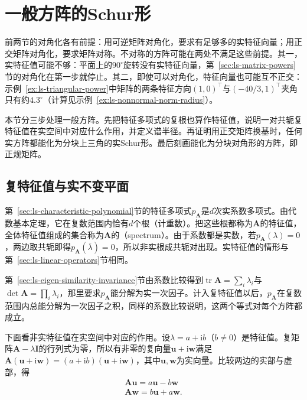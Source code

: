 
\section{一般方阵的Schur形}
\label{sec:ls-general-square-spectrum}

前两节的对角化各有前提：用可逆矩阵对角化，要求有足够多的实特征向量；用正交矩阵对角化，要求矩阵对称。不对称的方阵可能在两处不满足这些前提。其一，实特征值可能不够：平面上的$90^\circ$旋转没有实特征向量，第~\ref{sec:ls-matrix-powers}节的对角化在第一步就停止。其二，即使可以对角化，特征向量也可能互不正交：示例~\ref{ex:ls-triangular-power}中矩阵的两条特征方向$(1,0)^\top$与$(-40/3,1)^\top$夹角只有约$4.3^\circ$（计算见示例~\ref{ex:ls-nonnormal-norm-radius}）。

本节分三步处理一般方阵。先把特征多项式的复根也算作特征值，说明一对共轭复特征值在实空间中对应什么作用，并定义谱半径。再证明用正交矩阵换基时，任何实方阵都能化为分块上三角的实Schur形。最后刻画能化为分块对角形的方阵，即正规矩阵。

\subsection{复特征值与实不变平面}

第~\ref{sec:ls-characteristic-polynomial}节的特征多项式$p_{\bm A}$是$d$次实系数多项式。由代数基本定理，它在复数范围内恰有$d$个根（计重数）。把这些根都称为$\bm A$的特征值，全体特征值组成的集合称为$\bm A$的（spectrum）。由于系数都是实数，若$p_{\bm A}(\lambda)=0$，两边取共轭即得$p_{\bm A}(\bar\lambda)=0$，所以非实根成共轭对出现。实特征值的情形与第~\ref{sec:ls-linear-operators}节相同。

第~\ref{sec:ls-eigen-similarity-invariance}节由系数比较得到$\operatorname{tr}\bm A=\sum_i\lambda_i$与$\det\bm A=\prod_i\lambda_i$，那里要求$p_{\bm A}$能分解为实一次因子。计入复特征值以后，$p_{\bm A}$在复数范围内总能分解为一次因子之积，同样的系数比较说明，这两个等式对每个方阵都成立。

下面看非实特征值在实空间中对应的作用。设$\lambda=a+\mathrm ib$（$b\neq0$）是特征值。复矩阵$\bm A-\lambda\bm I$的行列式为零，所以有非零的复向量$\bm u+\mathrm i\bm w$满足$\bm A(\bm u+\mathrm i\bm w)=(a+\mathrm ib)(\bm u+\mathrm i\bm w)$，其中$\bm u,\bm w$为实向量。比较两边的实部与虚部，得
\[
 \begin{gathered}
\bm A\bm u=a\bm u-b\bm w\\
\bm A\bm w=b\bm u+a\bm w .
 \end{gathered}
\]

